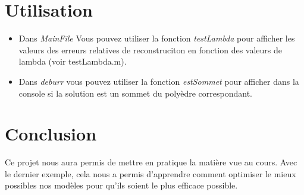 \documentclass[a4paper, 12pt]{article}
\begin{document}
\section{Utilisation}
	\begin{itemize}
		\item Dans \textit{MainFile} Vous pouvez utiliser la fonction \textit{testLambda} pour afficher les valeurs des erreurs relatives de reconstruciton en fonction des valeurs de lambda (voir testLambda.m). 
		\item Dans \textit{deburr} vous pouvez utiliser la fonction \textit{estSommet} pour afficher dans la console si la solution est un sommet du polyèdre correspondant.
	\end{itemize}
\section{Conclusion}
	Ce projet nous aura permis de mettre en pratique la matière vue au cours. Avec le dernier exemple, cela nous a permis d'apprendre comment optimiser le mieux possibles nos modèles pour qu'ils soient le plus efficace possible.
\end{document}
